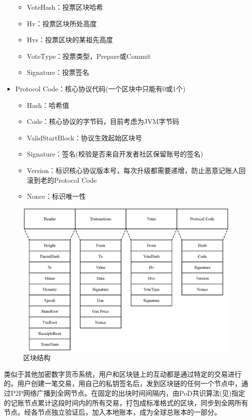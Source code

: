 \begin{itemize}
\begin{itemize}
		\item VoteHash：投票区块哈希
		\item Hv：投票区块所处高度
		\item Hvs：投票区块的某祖先高度
		\item VoteType：投票类型，Prepare或Commit
		\item Signature：投票签名
		\end{itemize}
	\item Protocol Code：核心协议代码(一个区块中只能有0或1个)
		\begin{itemize}
		\item Hash：哈希值
		\item Code：核心协议的字节码，目前考虑为JVM字节码
		\item ValidStartBlock：协议生效起始区块号
		\item Signature：签名(校验是否来自开发者社区保留账号的签名)
		\item Version：标识核心协议版本号，每次升级都需要递增，防止恶意记账人回滚到老的Protocol Code
		\item Nonce：标识唯一性
		\end{itemize}
\end{itemize}

\begin{figure}[h]
\centering
\includegraphics[width=14cm]{./figs/block}
\caption{区块结构}
\label{fig:block}
\end{figure}


类似于其他加密数字货币系统，用户和区块链上的互动都是通过特定的交易进行的。用户创建一笔交易，用自己的私钥签名后，发到区块链的任何一个节点中，通过P2P网络广播到全网节点。在固定的出块时间间隔内，由PoD共识算法(见)指定的记账节点累计这段时间内的所有交易，打包成标准格式的区块，同步到全网所有节点。经各节点独立验证后，加入本地账本，成为全球总账本的一部分。

